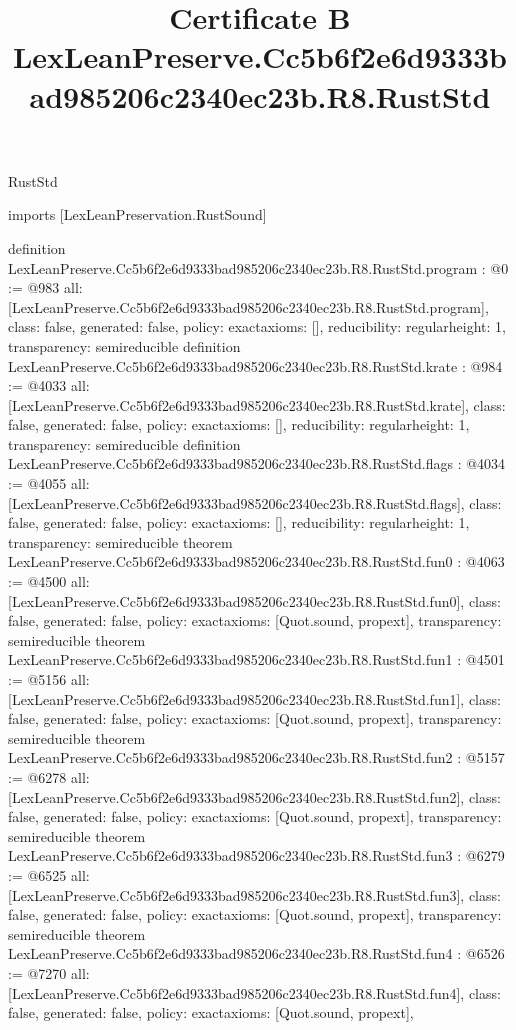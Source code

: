 \begin{lexlean}{RustStd}
\title{Certificate B LexLeanPreserve.Cc5b6f2e6d9333bad985206c2340ec23b.R8.RustStd}
\begin{coremodule}
imports [LexLeanPreservation.RustSound]

definition LexLeanPreserve.Cc5b6f2e6d9333bad985206c2340ec23b.R8.RustStd.program : @0 := @983 {
  all: [LexLeanPreserve.Cc5b6f2e6d9333bad985206c2340ec23b.R8.RustStd.program],
  class: false,
  generated: false,
  policy: exact{axioms: []},
  reducibility: regular{height: 1},
  transparency: semireducible
}
definition LexLeanPreserve.Cc5b6f2e6d9333bad985206c2340ec23b.R8.RustStd.krate : @984 := @4033 {
  all: [LexLeanPreserve.Cc5b6f2e6d9333bad985206c2340ec23b.R8.RustStd.krate],
  class: false,
  generated: false,
  policy: exact{axioms: []},
  reducibility: regular{height: 1},
  transparency: semireducible
}
definition LexLeanPreserve.Cc5b6f2e6d9333bad985206c2340ec23b.R8.RustStd.flags : @4034 := @4055 {
  all: [LexLeanPreserve.Cc5b6f2e6d9333bad985206c2340ec23b.R8.RustStd.flags],
  class: false,
  generated: false,
  policy: exact{axioms: []},
  reducibility: regular{height: 1},
  transparency: semireducible
}
theorem LexLeanPreserve.Cc5b6f2e6d9333bad985206c2340ec23b.R8.RustStd.fun0 : @4063 := @4500 {
  all: [LexLeanPreserve.Cc5b6f2e6d9333bad985206c2340ec23b.R8.RustStd.fun0],
  class: false,
  generated: false,
  policy: exact{axioms: [Quot.sound, propext]},
  transparency: semireducible
}
theorem LexLeanPreserve.Cc5b6f2e6d9333bad985206c2340ec23b.R8.RustStd.fun1 : @4501 := @5156 {
  all: [LexLeanPreserve.Cc5b6f2e6d9333bad985206c2340ec23b.R8.RustStd.fun1],
  class: false,
  generated: false,
  policy: exact{axioms: [Quot.sound, propext]},
  transparency: semireducible
}
theorem LexLeanPreserve.Cc5b6f2e6d9333bad985206c2340ec23b.R8.RustStd.fun2 : @5157 := @6278 {
  all: [LexLeanPreserve.Cc5b6f2e6d9333bad985206c2340ec23b.R8.RustStd.fun2],
  class: false,
  generated: false,
  policy: exact{axioms: [Quot.sound, propext]},
  transparency: semireducible
}
theorem LexLeanPreserve.Cc5b6f2e6d9333bad985206c2340ec23b.R8.RustStd.fun3 : @6279 := @6525 {
  all: [LexLeanPreserve.Cc5b6f2e6d9333bad985206c2340ec23b.R8.RustStd.fun3],
  class: false,
  generated: false,
  policy: exact{axioms: [Quot.sound, propext]},
  transparency: semireducible
}
theorem LexLeanPreserve.Cc5b6f2e6d9333bad985206c2340ec23b.R8.RustStd.fun4 : @6526 := @7270 {
  all: [LexLeanPreserve.Cc5b6f2e6d9333bad985206c2340ec23b.R8.RustStd.fun4],
  class: false,
  generated: false,
  policy: exact{axioms: [Quot.sound, propext]},
}
\end{coremodule}
\end{lexlean}
